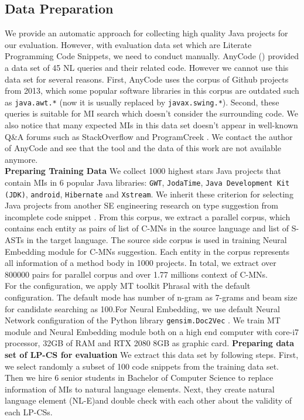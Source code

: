 \documentclass[sigconf,review,anonymous]{article}
\begin{document}
\subsection{Data Preparation}
We provide an automatic approach for collecting high quality Java projects for our evaluation. However, with evaluation data set which are Literate Programming Code Snippets, we need to conduct manually. AnyCode (\cite{007}) provided a data set of 45 NL queries and their related code. However we cannot use this data set for several reasons. First, AnyCode uses the corpus of Github projects from 2013, which some popular software libraries in this corpus are outdated such as \texttt{java.awt.*} (now it is usually replaced by \texttt{javax.swing.*}). Second, these queries is suitable for MI search which doesn't consider the surrounding code. We also notice that many expected MIs in this data set doesn't appear in well-known Q&A forums such as StackOverflow \cite{021} and ProgramCreek \cite{020}. We contact the author of AnyCode \cite{007} and see that the tool and the data of this work are not available anymore.
\\

\textbf{Preparing Training Data} We collect 1000 highest stars Java projects that contain MIs in 6 popular Java libraries: \texttt{GWT}, \texttt{JodaTime}, \texttt{Java Development Kit (JDK)}, \texttt{android}, \texttt{Hibernate} and \texttt{Xstream}. We inherit these criterion for selecting Java projects from another SE engineering research on type suggestion from incomplete code snippet \cite{022}. From this corpus, we extract a parallel corpus, which contains each entity as pairs of list of C-MNs in the source language and list of S-ASTs in the target language. The source side corpus is used in training Neural Embedding module for C-MNs suggestion. Each entity in the corpus represents all information of a method body in 1000 projects. In total, we extract over 800000 pairs for parallel corpus and over 1.77 millions context of C-MNs.
\\
For the configuration, we apply MT toolkit Phrasal \cite{015} with the default configuration. The default mode has number of n-gram as 7-grams and beam size for candidate searching as 100.For Neural Embedding, we use default Neural Network configuration of the Python library \texttt{gensim.Doc2Vec} \cite{023}. We train MT module and Neural Embedding module both on a high end computer with core-i7 processor, 32GB of RAM and RTX 2080 8GB as graphic card.
\textbf{Preparing data set of LP-CS for evaluation} We extract this data set by following steps. First, we select randomly a subset of 100 code snippets from the training data set. Then we hire 6 senior students in Bachelor of Computer Science to replace information of MIs to natural language elements. Next, they create natural language element (NL-E)and double check with each other about the validity of each LP-CSs.  
\end{document}
